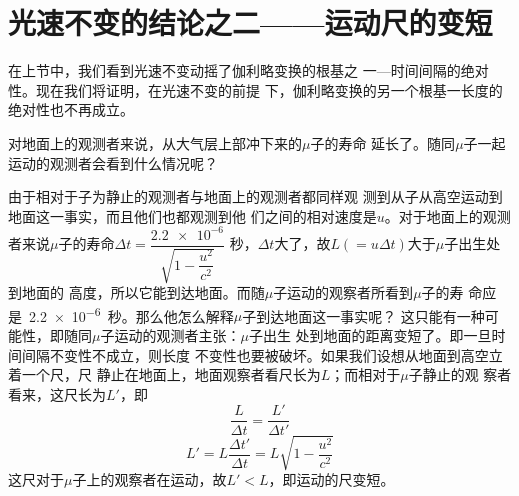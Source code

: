 \section{光速不变的结论之二——运动尺的变短}\label{sec:02.08}

在上节中，我们看到光速不变动摇了伽利略变换的根基之
一—时间间隔的绝对性。现在我们将证明，在光速不变的前提
下，伽利略变换的另一个根基一长度的绝对性也不再成立。

对地面上的观测者来说，从大气层上部冲下来的$ \mu $子的寿命
延长了。随同$ \mu $子一起运动的观测者会看到什么情况呢？

由于相对于子为静止的观测者与地面上的观测者都同样观
测到从子从高空运动到地面这一事实，而且他们也都观测到他
们之间的相对速度是$u$。对于地面上的观测者来说$\mu$子的寿命$\Delta t = \dfrac{\num{2.2e-6}}{\sqrt{1 - \dfrac{u ^ 2}{c ^ 2}}}$
秒，$\Delta t$大了，故$ L ( = u \Delta t )$大于$\mu$子出生处到地面的
高度，所以它能到达地面。而随$\mu$子运动的观察者所看到$\mu$子的寿
命应是~\num{2.2e-6}~秒。那么他怎么解释$\mu$子到达地面这一事实呢？
这只能有一种可能性，即随同$\mu$子运动的观测者主张：$\mu$子出生
处到地面的距离变短了。即一旦时间间隔不变性不成立，则长度
不变性也要被破坏。如果我们设想从地面到高空立着一个尺，尺
静止在地面上，地面观察者看尺长为$L$；而相对于$\mu$子静止的观
察者看来，这尺长为$L'$，即
\begin{equation*}
    \frac { L } { \Delta t } = \frac { L ' } { \Delta t ' }
\end{equation*}
\begin{equation}\label{eqn:02.08.01}
    L ' = L \frac { \Delta t ' } { \Delta t } = L \sqrt { 1 - \frac { u ^ { 2 } }  { c ^ { 2 } } }
\end{equation}
这尺对于$\mu$子上的观察者在运动，故$ L ' < L  $，即运动的尺变短。

